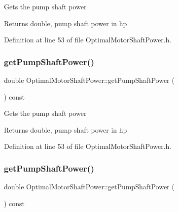Gets the pump shaft power \begin{DoxyReturn}{Returns}
double, pump shaft power in hp 
\end{DoxyReturn}


Definition at line 53 of file Optimal\+Motor\+Shaft\+Power.\+h.

\mbox{\label{class_optimal_motor_shaft_power_aca7bb632c659ecf2ebf3cb9fdb23626f}} 
\subsubsection{\texorpdfstring{get\+Pump\+Shaft\+Power()}{getPumpShaftPower()}\hspace{0.1cm}{\footnotesize\ttfamily [2/3]}}
{\footnotesize\ttfamily double Optimal\+Motor\+Shaft\+Power\+::get\+Pump\+Shaft\+Power (\begin{DoxyParamCaption}{ }\end{DoxyParamCaption}) const\hspace{0.3cm}{\ttfamily [inline]}}

Gets the pump shaft power \begin{DoxyReturn}{Returns}
double, pump shaft power in hp 
\end{DoxyReturn}


Definition at line 53 of file Optimal\+Motor\+Shaft\+Power.\+h.

\mbox{\label{class_optimal_motor_shaft_power_aca7bb632c659ecf2ebf3cb9fdb23626f}} 
\subsubsection{\texorpdfstring{get\+Pump\+Shaft\+Power()}{getPumpShaftPower()}\hspace{0.1cm}{\footnotesize\ttfamily [3/3]}}
{\footnotesize\ttfamily double Optimal\+Motor\+Shaft\+Power\+::get\+Pump\+Shaft\+Power (\begin{DoxyParamCaption}{ }\end{DoxyParamCaption}) const\hspace{0.3cm}{\ttfamily [inline]}}

